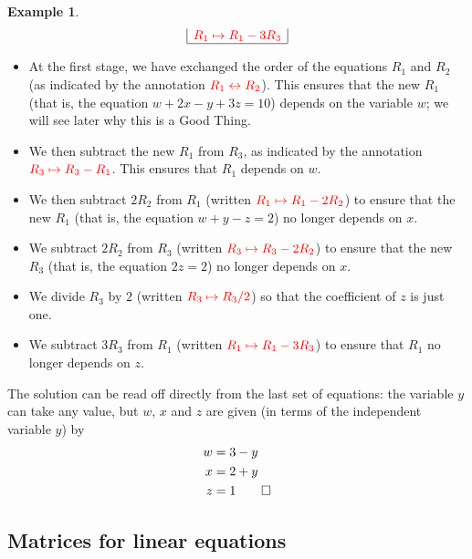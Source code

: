 \documentclass[a4paper]{book}
\theoremstyle{definition}
\newtheorem{example}[theorem]{Example}
\begin{document}
\begin{example}
{\[\begin{array}{|c|c|c|}
 {\color{red}R_1 \mapsto R_1-3R_3} \\
 \hline
 \end{array}
 \]}
 \begin{itemize}
  \item At the first stage, we have exchanged the order of the equations
   $R_1$ and $R_2$ (as indicated by the annotation
   ${\color{red}R_1\leftrightarrow R_2}$).  This ensures that the new $R_1$
   (that is, the equation $w+2x-y+3z=10$) depends on the variable $w$;
   we will see later why this is a Good Thing.
  \item We then subtract the new $R_1$ from $R_3$, as indicated by the
   annotation ${\color{red}R_3\mapsto R_3-R_1}$.  This ensures that 
   $R_1$ depends on $w$.
  \item We then subtract $2R_2$ from $R_1$ (written
   ${\color{red}R_1\mapsto R_1-2R_2}$) to ensure that the new $R_1$ (that is,
   the equation $w+y-z=2$) no longer depends on $x$.
  \item We subtract $2R_2$ from $R_3$ (written
   ${\color{red}R_3\mapsto R_3-2R_2}$) to ensure that the new $R_3$ (that is,
   the equation $2z=2$) no longer depends on $x$.
  \item We divide $R_3$ by $2$ (written ${\color{red}R_3\mapsto R_3/2}$) so
   that the coefficient of $z$ is just one.
  \item We subtract $3R_3$ from $R_1$ (written ${\color{red}R_1\mapsto R_1-3R_3}$) to
   ensure that $R_1$ no longer depends on $z$.
 \end{itemize}
 The solution can be read off directly from the last set of equations:
 the variable $y$ can take any value, but $w$, $x$ and $z$ are given
 (in terms of the independent variable $y$) by
 \begin{align*}
  w &= 3-y  \\
  x &= 2+y   \\
  z &= 1 \qed
 \end{align*}
\end{example}

\subsection{Matrices for linear equations}
\label{subsec-mat-lin}
\end{document}
